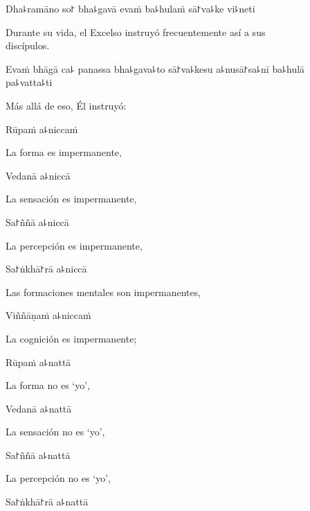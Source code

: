Dha꜕ramāno so꜓ bha꜕gavā evaṁ ba꜕hulaṁ sā꜓va꜕ke vi꜕neti

\begin{english}
  Durante su vida, el Excelso instruyó frecuentemente así a sus\\ discípulos.
\end{english}

Evaṁ bhāgā ca꜕ panassa bha꜕gava꜕to sā꜓va꜕kesu a꜕nusā꜓sa꜕nī ba꜕hulā pa꜕vatta꜕ti

\begin{english}
  Más allá de eso, Él instruyó:
\end{english}


Rūpaṁ a꜕niccaṁ

\begin{english}
  La forma es impermanente,
\end{english}

Vedanā a꜕niccā

\begin{english}
  La sensación es impermanente,
\end{english}

Sa꜓ññā a꜕niccā

\begin{english}
  La percepción es impermanente,
\end{english}

Sa꜓ṅkhā꜓rā a꜕niccā

\begin{english}
  Las formaciones mentales son impermanentes,
\end{english}

Viññāṇaṁ a꜕niccaṁ

\begin{english}
  La cognición es impermanente;
\end{english}

Rūpaṁ a꜕nattā

\begin{english}
  La forma no es `yo',
\end{english}

Vedanā a꜕nattā

\begin{english}
  La sensación no es `yo',
\end{english}

Sa꜓ññā a꜕nattā

\begin{english}
  La percepción no es `yo',
\end{english}

Sa꜓ṅkhā꜓rā a꜕nattā

